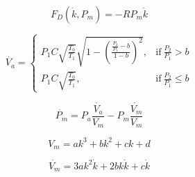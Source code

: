 \documentclass[11pt,a4paper]{article}
\begin{document}
\begin{appendices}
\begin{equation}
    F_D(\dot{k},P_m) = -RP_m\dot{k}
\end{equation}

\begin{equation}
   \dot{V_a} = \begin{cases} 
        P_1C\sqrt{\frac{T_0}{T_1}}\sqrt{1-(\frac{\frac{P_2}{P_1}-b}{1-b})^2}, & \text{if}\ \frac{P_2}{P_1} > b\\ 
        P_1C\sqrt{\frac{T_0}{T_1}}, & \text{if}\ \frac{P_2}{P_1} \leq b \end{cases}
\end{equation}

\begin{equation}
    \dot{P_m} = P_a\frac{\dot{V_a}}{V_m}-P_m\frac{\dot{V_m}}{V_m}
\end{equation}

\begin{equation}
    V_m = ak^3 + bk^2 + ck + d
\end{equation}

\begin{equation}
    \dot{V_m} = 3ak^2\dot{k} + 2bk\dot{k} + c\dot{k}
\end{equation}


\end{appendices}
\end{document}
